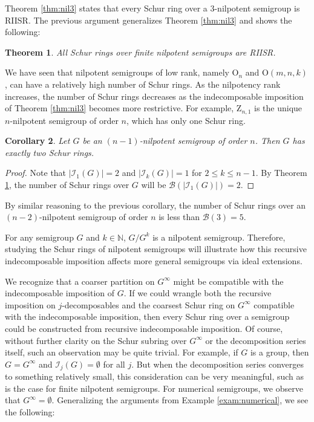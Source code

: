 \documentclass{article}
\theoremstyle{plain}
\newtheorem{Thm}{Theorem}[section]
\newtheorem{Cor}[Thm]{Corollary}
\theoremstyle{definition}
\newcommand{\thmref}[1]{Theorem \ref{#1}}
\newcommand{\examref}[1]{Example \ref{#1}}
\newcommand{\N}{\mathbb{N}}
\newcommand{\I}{\mathscr{I}}
\newcommand{\B}{\mathscr{B}}
\renewcommand{\O}{\mathrm{O}}
\newcommand{\z}{\mathrm{Z}}
\begin{document}
\thmref{thm:nil3} states that every Schur ring over a $3$-nilpotent semigroup is RIISR. The previous argument generalizes \thmref{thm:nil3} and shows the following:

\begin{Thm}\label{thm:nilriisr} All Schur rings over finite nilpotent semigroups are RIISR.
\end{Thm}

We have seen that nilpotent semigroups of low rank, namely $\O_n$ and $\O(m,n,k)$, can have a relatively high number of Schur rings. As the nilpotency rank increases, the number of Schur rings decreases as the indecomposable imposition of \thmref{thm:nil3} becomes more restrictive. For example, $\z_{n, 1}$ is the unique $n$-nilpotent semigroup of order $n$, which has only one Schur ring.

\begin{Cor} Let $G$ be an $(n-1)$-nilpotent semigroup of order $n$. Then $G$ has exactly two Schur rings.
\end{Cor}
\begin{proof}
    Note that $|\I_1(G)|= 2$ and $|\I_k(G)| = 1$ for $2\le k \le n-1$. By \thmref{thm:nilriisr}, the number of Schur rings over $G$ will be $\B(|\I_1(G)|) = 2$. 
\end{proof}

By similar reasoning to the previous corollary, the number of Schur rings over an $(n-2)$-nilpotent semigroup of order $n$ is less than $\B(3)=5$.

For any semigroup $G$ and $k\in \N$, $G/G^k$ is a nilpotent semigroup. Therefore, studying the Schur rings of nilpotent semigroups will illustrate how this recursive indecomposable imposition affects more general semigroups via ideal extensions.

We recognize that a coarser partition on $G^\infty$ might be compatible with the indecomposable imposition of $G$. If we could wrangle both the recursive imposition on $j$-decomposables and the coarsest Schur ring on $G^\infty$ compatible with the indecomposable imposition, then every Schur ring over a semigroup could be constructed from recursive indecomposable imposition. Of course, without further clarity on the Schur subring over $G^\infty$ or the decomposition series itself, such an observation may be quite trivial. For example, if $G$ is a group, then $G=G^\infty$ and $\I_j(G)=\emptyset$ for all $j$. But when the decomposition series converges to something relatively small, this consideration can be very meaningful, such as is the case for finite nilpotent semigroups. For numerical semigroups, we observe that $G^\infty = \emptyset$. Generalizing the arguments from \examref{exam:numerical}, we see the following:
\end{document}
